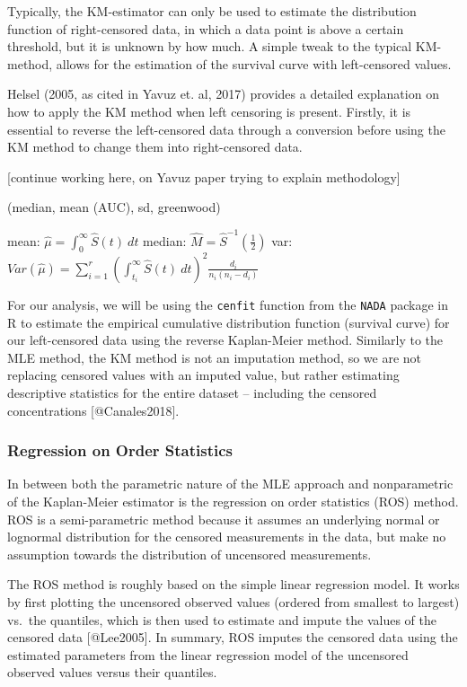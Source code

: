 \documentclass[
]{article}
\begin{document}
Typically, the KM-estimator can only be used to estimate the
distribution function of right-censored data, in which a data point is
above a certain threshold, but it is unknown by how much. A simple tweak
to the typical KM-method, allows for the estimation of the survival
curve with left-censored values.

Helsel (2005, as cited in Yavuz et. al, 2017) provides a detailed
explanation on how to apply the KM method when left censoring is
present. Firstly, it is essential to reverse the left-censored data
through a conversion before using the KM method to change them into
right-censored data.

{[}continue working here, on Yavuz paper trying to explain
methodology{]}

(median, mean (AUC), sd, greenwood)

mean: \(\hat{\mu} = \int_{0}^{\infty} \hat{S}(t) \ dt\) median:
\(\hat{M} = \hat{S}^{-1} \left (\frac{1}{2} \right)\) var:
\(Var(\hat{\mu}) = \sum_{i=1}^{r} \left( \int_{t_i}^{\infty}\hat{S}(t) \ dt \right)^2 \frac{d_i}{n_i(n_i - d_i)}\)

For our analysis, we will be using the \texttt{cenfit} function from the
\texttt{NADA} package in R to estimate the empirical cumulative
distribution function (survival curve) for our left-censored data using
the reverse Kaplan-Meier method. Similarly to the MLE method, the KM
method is not an imputation method, so we are not replacing censored
values with an imputed value, but rather estimating descriptive
statistics for the entire dataset -- including the censored
concentrations {[}@Canales2018{]}.

\hypertarget{ROS}{%
\subsubsection{Regression on Order Statistics}\label{ROS}}

In between both the parametric nature of the MLE approach and
nonparametric of the Kaplan-Meier estimator is the regression on order
statistics (ROS) method. ROS is a semi-parametric method because it
assumes an underlying normal or lognormal distribution for the censored
measurements in the data, but make no assumption towards the
distribution of uncensored measurements.

The ROS method is roughly based on the simple linear regression model.
It works by first plotting the uncensored observed values (ordered from
smallest to largest) vs.~the quantiles, which is then used to estimate
and impute the values of the censored data {[}@Lee2005{]}. In summary,
ROS imputes the censored data using the estimated parameters from the
linear regression model of the uncensored observed values versus their
quantiles.
\end{document}
